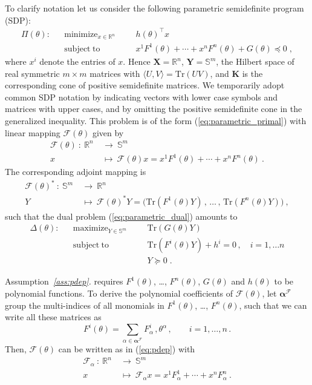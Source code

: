\documentclass{article}
\DeclareMathOperator*{\minimize}{minimize}
\DeclareMathOperator*{\maximize}{maximize}
\DeclareMathOperator*{\subj}{subject\;to}
\newcommand{\R}{\mathbb{R}}         %
\renewcommand{\S}{\mathbb{S}}       %
\newcommand{\Tr}{\mathrm{Tr}}       %
\renewcommand{\t}{\intercal}        %
\newcommand{\adj}{\ast}                     %
\newcommand{\ppar}{\theta}                          %
\newcommand{\X}{\mathbf{X}}                         %
\newcommand{\Y}{\mathbf{Y}}                         %
\newcommand{\K}{\mathbf{K}}                         %
\newcommand{\calF}{\mathcal{F}}                     %
\newcommand{\Alpha}{\bm{\alpha}}    %
\begin{document}
To clarify notation let us consider the following parametric semidefinite program (SDP):
\[ \begin{aligned}
\Pi(\ppar): && \minimize_{x\in\R^n} &&& h(\ppar)^\t x \\
            && \subj                &&& x^1F^1(\ppar) + \cdots + x^nF^n(\ppar) + G(\ppar) \preceq 0 \;,%
\end{aligned} \]
where $x^i$ denote the entries of $x$. Hence $\X = \R^n$, $\Y=\S^m$, the Hilbert space of real symmetric $m\times m$ matrices with $\langle U,V\rangle=\Tr(UV)$, and $\K$ is the corresponding cone of positive semidefinite matrices. We temporarily adopt common SDP notation by indicating vectors with lower case symbols and matrices with upper cases, and by omitting the positive semidefinite cone in the generalized inequality. This problem is of the form (\ref{eq:parametric_primal}) with linear mapping $\calF(\ppar)$ given by
\begin{align*}
\calF(\ppar) ~:~ \R^n~ &\rightarrow~ \S^m \\
                  x~ &\mapsto~ \calF(\ppar)x = x^1F^1(\ppar) + \cdots + x^nF^n(\ppar) ~.%
\end{align*}
The corresponding adjoint mapping is
\begin{align*}
\calF(\ppar)^\adj ~:~ \S^m~ &\rightarrow~ \R^n\\
                      Y~ &\mapsto~ \calF(\ppar)^\adj Y = \big(\Tr(F^1(\ppar)Y) \,,\, \ldots \,,\, \Tr(F^n(\ppar)Y)\big) ~,%
\end{align*}
such that the dual problem (\ref{eq:parametric_dual}) amounts to
\[ \begin{aligned}
\Delta(\ppar): && \maximize_{Y\in\S^m} &&& \Tr(G(\ppar)Y) \\
               && \subj                &&& \Tr(F^i(\ppar)Y) + h^i = 0\,,\quad i=1,\ldots n \\%
               &&                      &&& Y \succeq 0 \;.
\end{aligned} \]

Assumption~{\it{}\ref{ass:pdep}.} requires $F^1(\ppar)$, \ldots, $F^n(\ppar)$, $G(\ppar)$ and $h(\ppar)$ to be polynomial functions. To derive the polynomial coefficients of $\calF(\ppar)$, let $\Alpha^\calF$ group the multi-indices of all monomials in $F^1(\ppar)$, \ldots, $F^n(\ppar)$, such that we can write all these matrices as
\[  F^i(\ppar) = \sum_{\alpha\in\Alpha^\calF} F^i_\alpha \,, \ppar^\alpha\,,\qquad i=1,\ldots,n\,.%
\]
Then, $\calF(\ppar)$ can be written as in (\ref{eq:pdep}) with
\begin{align*}
\calF_\alpha ~:~ \R^n~ &\rightarrow~ \S^m \\
                    x~ &\mapsto~ \calF_\alpha x = x^1F^1_\alpha + \cdots + x^nF^n_\alpha ~.%
\end{align*}
\end{document}
